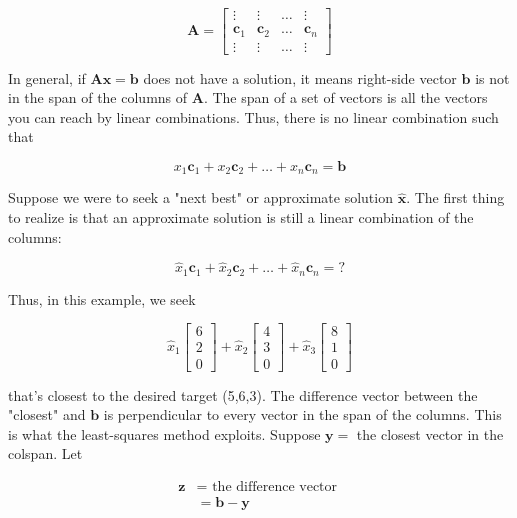 \documentclass[main.tex]{subfiles}
\begin{document}
    $$\mathbf{A}=\left[\begin{array}{cccc}\vdots & \vdots & \ldots & \vdots \\ \mathbf{c}_{1} & \mathbf{c}_{2} & \ldots & \mathbf{c}_{n} \\ \vdots & \vdots & \ldots & \vdots\end{array}\right]$$
    
    In general, if $\mathbf{A} \mathbf{x}=\mathbf{b}$ does not have a solution, it means right-side vector $\mathbf{b}$ is not in the span of the columns of $\mathbf{A}$. The span of a set of vectors is all the vectors you can reach by linear combinations. Thus, there is no linear combination such that
    
    $$x_{1} \mathbf{c}_{1}+x_{2} \mathbf{c}_{2}+\ldots+x_{n} \mathbf{c}_{n}=\mathbf{b}$$
    
    Suppose we were to seek a "next best" or approximate solution $\hat{\mathbf{x}}$. The first thing to realize is that an approximate solution is still a linear combination of the columns:
    
    $$\hat{x}_{1} \mathbf{c}_{1}+\hat{x}_{2} \mathbf{c}_{2}+\ldots+\hat{x}_{n} \mathbf{c}_{n}=?$$
    
    Thus, in this example, we seek

    $$\hat{x}_{1}\left[\begin{array}{l}6 \\ 2 \\ 0\end{array}\right]+\hat{x}_{2}\left[\begin{array}{l}4 \\ 3 \\ 0\end{array}\right]+\hat{x}_{3}\left[\begin{array}{l}8 \\ 1 \\ 0\end{array}\right]$$
    
    that's closest to the desired target (5,6,3). The difference vector between the "closest" and $\mathbf{b}$ is perpendicular to every vector in the span of the columns. This is what the least-squares method exploits. Suppose $\mathbf{y}=$ the closest vector in the colspan. Let 
    
    $$\begin{aligned} \mathbf{z} &=\text { the difference vector } \\ &=\mathbf{b}-\mathbf{y} \end{aligned}$$
    
\end{document}
